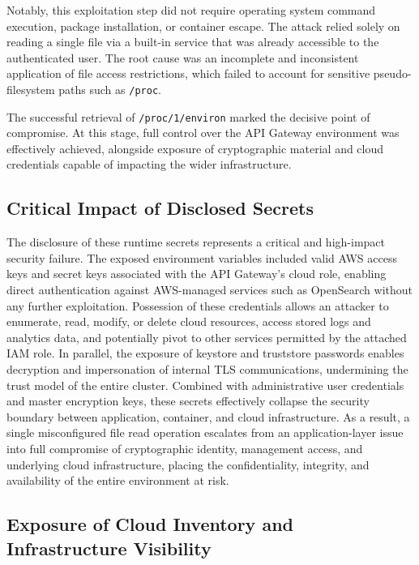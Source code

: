 \documentclass[12pt,a4paper]{report}
\begin{document}
Notably, this exploitation step did not require operating system command execution, package installation, or container escape. The attack relied solely on reading a single file via a built-in service that was already accessible to the authenticated user. The root cause was an incomplete and inconsistent application of file access restrictions, which failed to account for sensitive pseudo-filesystem paths such as \texttt{/proc}.

The successful retrieval of \texttt{/proc/1/environ} marked the decisive point of compromise. At this stage, full control over the API Gateway environment was effectively achieved, alongside exposure of cryptographic material and cloud credentials capable of impacting the wider infrastructure.

\subsection{Critical Impact of Disclosed Secrets}

The disclosure of these runtime secrets represents a critical and high-impact security failure. The exposed environment variables included valid AWS access keys and secret keys associated with the API Gateway’s cloud role, enabling direct authentication against AWS-managed services such as OpenSearch without any further exploitation. Possession of these credentials allows an attacker to enumerate, read, modify, or delete cloud resources, access stored logs and analytics data, and potentially pivot to other services permitted by the attached IAM role. In parallel, the exposure of keystore and truststore passwords enables decryption and impersonation of internal TLS communications, undermining the trust model of the entire cluster. Combined with administrative user credentials and master encryption keys, these secrets effectively collapse the security boundary between application, container, and cloud infrastructure. As a result, a single misconfigured file read operation escalates from an application-layer issue into full compromise of cryptographic identity, management access, and underlying cloud infrastructure, placing the confidentiality, integrity, and availability of the entire environment at risk.

\subsection{Exposure of Cloud Inventory and Infrastructure Visibility}
\end{document}
